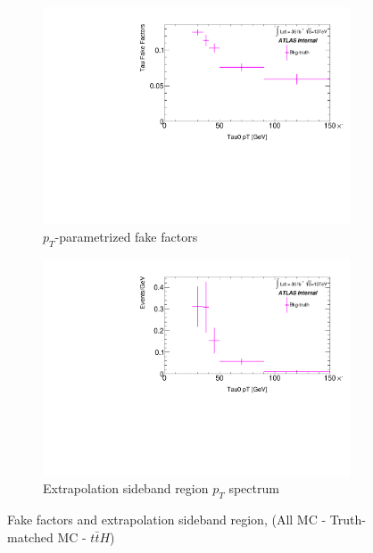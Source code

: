 \documentclass[11pt]{article}
\begin{document}
	\begin{figure}[H]
	\centering
	\begin{subfigure}{.5\textwidth}
	\centering
	\includegraphics[width=1.\linewidth]{figures/FakesEstimate_data_pp8_nonallhad_new_SubtractionFix_newOverlay/FF_Faketau_Bkg-truth.pdf}
  	\caption{$p_T$-parametrized fake factors}
  	\label{fig:sub1}
	\end{subfigure}%
	\begin{subfigure}{.5\textwidth}
	\centering
	\includegraphics[width=1.\linewidth]{figures/FakesEstimate_data_pp8_nonallhad_new_SubtractionFix_newOverlay/hist_Extrapolation_Bkg-truth.pdf}
	\caption{Extrapolation sideband region $p_T$ spectrum}
	\end{subfigure}
	\caption{Fake factors and extrapolation sideband region, (All MC - Truth-matched MC - $t\bar{t}H$)}
	\end{figure}
\end{document}

